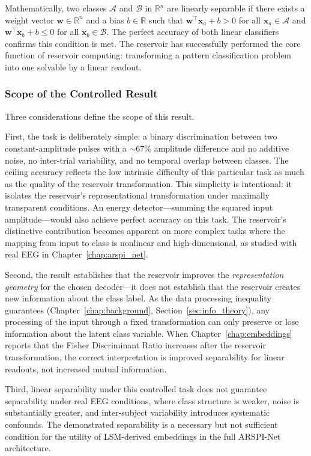 Mathematically, two classes $\mathcal{A}$ and $\mathcal{B}$ in $\mathbb{R}^n$ are linearly separable if there exists a weight vector $\mathbf{w} \in \mathbb{R}^n$ and a bias $b \in \mathbb{R}$ such that $\mathbf{w}^\top \mathbf{x}_a + b > 0$ for all $\mathbf{x}_a \in \mathcal{A}$ and $\mathbf{w}^\top \mathbf{x}_b + b \leq 0$ for all $\mathbf{x}_b \in \mathcal{B}$. The perfect accuracy of both linear classifiers confirms this condition is met. The reservoir has successfully performed the core function of reservoir computing: transforming a pattern classification problem into one solvable by a linear readout.

\subsubsection{Scope of the Controlled Result}

Three considerations define the scope of this result.

First, the task is deliberately simple: a binary discrimination between two constant-amplitude pulses with a $\sim$67\% amplitude difference and no additive noise, no inter-trial variability, and no temporal overlap between classes. The ceiling accuracy reflects the low intrinsic difficulty of this particular task as much as the quality of the reservoir transformation. This simplicity is intentional: it isolates the reservoir's representational transformation under maximally transparent conditions. An energy detector---summing the squared input amplitude---would also achieve perfect accuracy on this task. The reservoir's distinctive contribution becomes apparent on more complex tasks where the mapping from input to class is nonlinear and high-dimensional, as studied with real EEG in Chapter~\ref{chap:arspi_net}.

Second, the result establishes that the reservoir improves the \emph{representation geometry} for the chosen decoder---it does not establish that the reservoir creates new information about the class label. As the data processing inequality guarantees (Chapter~\ref{chap:background}, Section~\ref{sec:info_theory}), any processing of the input through a fixed transformation can only preserve or lose information about the latent class variable. When Chapter~\ref{chap:embeddings} reports that the Fisher Discriminant Ratio increases after the reservoir transformation, the correct interpretation is improved separability for linear readouts, not increased mutual information.

Third, linear separability under this controlled task does not guarantee separability under real EEG conditions, where class structure is weaker, noise is substantially greater, and inter-subject variability introduces systematic confounds. The demonstrated separability is a necessary but not sufficient condition for the utility of LSM-derived embeddings in the full ARSPI-Net architecture.

